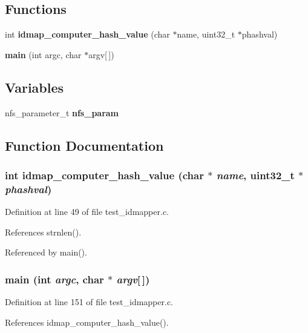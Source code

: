 \subsection*{Functions}
\begin{CompactItemize}
\item 
int {\bf idmap\_\-computer\_\-hash\_\-value} (char $\ast$name, uint32\_\-t $\ast$phashval)
\item 
{\bf main} (int argc, char $\ast$argv[$\,$])
\end{CompactItemize}
\subsection*{Variables}
\begin{CompactItemize}
\item 
nfs\_\-parameter\_\-t {\bf nfs\_\-param}
\end{CompactItemize}


\subsection{Function Documentation}
\subsubsection{\setlength{\rightskip}{0pt plus 5cm}int idmap\_\-computer\_\-hash\_\-value (char $\ast$ {\em name}, uint32\_\-t $\ast$ {\em phashval})}\label{test__idmapper_8c_a1}




Definition at line 49 of file test\_\-idmapper.c.

References strnlen().

Referenced by main().
\subsubsection{\setlength{\rightskip}{0pt plus 5cm}main (int {\em argc}, char $\ast$ {\em argv}[$\,$])}\label{test__idmapper_8c_a2}




Definition at line 151 of file test\_\-idmapper.c.

References idmap\_\-computer\_\-hash\_\-value().

